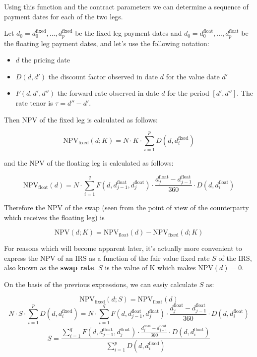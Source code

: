 \documentclass[11pt]{article}
\providecommand{\tightlist}{%
      \setlength{\itemsep}{0pt}\setlength{\parskip}{0pt}}
\begin{document}
    Using this function and the contract parameters we can determine a
sequence of payment dates for each of the two legs.

    Let \(d_0=d_0^{\mathrm{fixed}},...,d_p^{\mathrm{fixed}}\) be the fixed
leg payment dates and
\(d_0=d_0^{\mathrm{float}},...,d_p^{\mathrm{float}}\) be the floating
leg payment dates, and let's use the following notation:

\begin{itemize}
\tightlist
\item
  \(d\) the pricing date
\item
  \(D(d, d')\) the discount factor observed in date \(d\) for the value
  date \(d'\)
\item
  \(F(d, d', d'')\) the forward rate observed in date \(d\) for the
  period \([d', d'']\). The rate tenor is \(\tau = d'' - d'\).
\end{itemize}

    Then NPV of the fixed leg is calculated as follows:

\[\mathrm{NPV}_{\mathrm{fixed}}(d; K) = N\cdot K\cdot\sum_{i=1}^{p}D(d, d_{i}^{\mathrm{fixed}})\]

and the NPV of the floating leg is calculated as follows:

\[\mathrm{NPV}_{\mathrm{float}}(d) = N\cdot\sum_{i=1}^{q}F(d, d_{j-1}^{\mathrm{float}}, d_{j}^{\mathrm{float}}) \cdot \frac{d_{j}^{\mathrm{float}}-d_{j-1}^{\mathrm{float}}}{360}
\cdot D(d, d_{i}^{\mathrm{float}})\]

Therefore the NPV of the swap (seen from the point of view of the
counterparty which receives the floating leg) is

\[\mathrm{NPV}(d; K) = \mathrm{NPV}_{\mathrm{float}}(d) - \mathrm{NPV}_{\mathrm{fixed}}(d;K)\]

    For reasons which will become apparent later, it's actually more
convenient to express the NPV of an IRS as a function of the fair value
fixed rate \(S\) of the IRS, also known as the \textbf{swap rate}. \(S\)
is the value of K which makes \(\mathrm{NPV}(d)=0\).

On the basis of the previous expressions, we can easiy calculate \(S\)
as:

\[\mathrm{NPV}_{\mathrm{fixed}}(d;S) = \mathrm{NPV}_{\mathrm{float}}(d)\]
\[N\cdot S\cdot\sum_{i=1}^{p}D(d, d_{i}^{\mathrm{fixed}}) = N\cdot\sum_{i=1}^{q}F(d, d_{j-1}^{\mathrm{float}}, d_{j}^{\mathrm{float}}) \cdot \frac{d_{j}^{\mathrm{float}}-d_{j-1}^{\mathrm{float}}}{360} \cdot D(d, d_{i}^{\mathrm{float}})\]
\[S=\frac{\sum_{i=1}^{q}F(d, d_{j-1}^{\mathrm{float}}, d_{j}^{\mathrm{float}}) \cdot \frac{d_{j}^{\mathrm{float}}-d_{j-1}^{\mathrm{float}}}{360}
\cdot D(d, d_{i}^{\mathrm{float}})}{\sum_{i=1}^{p}D(d, d_i^{\mathrm{fixed}})} \]
\end{document}

